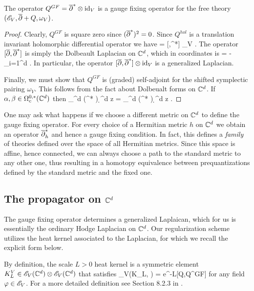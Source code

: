 \documentclass[10pt]{amsart}
\begin{document}
\begin{lem}
The operator $Q^{GF} = \overline{\partial}^* \otimes {\rm id}_V$ is a gauge fixing operator for the free theory $(\mathscr E_V, \overline{\partial} + Q, \omega_V)$.
\end{lem}
\begin{proof}
Clearly, $Q^{GF}$ is square zero since $(\overline{\partial}^*)^2 = 0$.
Since $Q^{hol}$ is a translation invariant holomorphic differential operator we have
 = [\dbar,\dbar^*] \tensor \id_{V} .
\een
The operator $[\overline{\partial},\overline{\partial}^*]$ is simply the Dolbeault Laplacian on $\mathbb C^d$, which 
in coordinates is
\ben
[\dbar,\dbar^*] = -\sum_{i=1}^d  .
\een
In particular, the operator $[\overline{\partial},\overline{\partial}^*] \otimes {\rm id}_{V}$ is a generalized Laplacian. 

Finally, we must show that $Q^{GF}$ is (graded) self-adjoint for the shifted symplectic pairing $\omega_V$. 
This follows from the fact about Dolbeualt forms on $\mathbb C^d$.
If $\alpha,\beta \in \Omega^{0,*}_c(\mathbb C^d)$ then
\ben 
\int_{\CC^d} (\dbar^* \alpha) \wedge \beta \wedge \d^d z = \pm \int_{\CC^d} \alpha \wedge (\dbar^* \beta) \wedge \d^d z .
\een
\end{proof}

\begin{rmk}
One may ask what happens if we choose a different metric on $\mathbb C^d$ to define the gauge fixing operator. 
For every choice of a Hermitian metric $h$ on $\mathbb C^d$ we obtain an operator $\overline{\partial}^*_h$ and hence a gauge fixing condition. 
In fact, this defines a {\em family} of theories defined over the space of all Hermitian metrics. 
Since this space is affine, hence connected, we can always choose a path to the standard metric to any other one, thus resulting in a homotopy equivalence between prequantizations defined by the standard metric and the fixed one. 
\end{rmk}

\subsection{The propagator on $\mathbb C^d$}

The gauge fixing operator determines a generalized Laplaican, which for us is essentially the ordinary Hodge Laplacian on $\mathbb C^d$. 
Our regularization scheme utilizes the heat kernel associated to the Laplacian, for which we recall the explicit form below.

By definition, the scale $L>0$ heat kernel is a symmetric element $K_L^V \in \mathscr E_V(\mathbb C^d) \otimes \mathscr E_V(\mathbb C^d)$ that satisfies
\ben
\omega_V(K_L, \varphi) = e^{-L[Q,Q^{GF}] } \varphi
\een
for any field $\varphi \in \mathscr E_V$.
For a more detailed definition see Section 8.2.3 in \cite{CG2}. 
\end{document}
